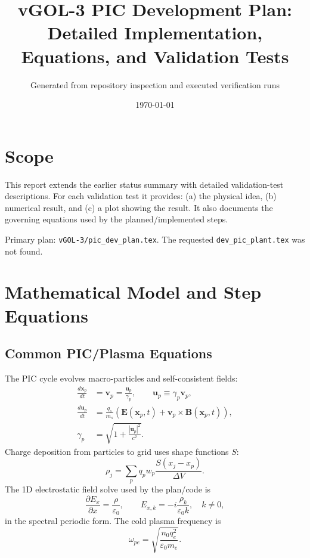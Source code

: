 \documentclass[11pt,a4paper]{article}
\title{vGOL-3 PIC Development Plan:\\Detailed Implementation, Equations, and Validation Tests}
\author{Generated from repository inspection and executed verification runs}
\date{\today}
\begin{document}
\maketitle
\tableofcontents
\newpage

\section{Scope}
This report extends the earlier status summary with detailed validation-test descriptions. For each validation test it provides: (a) the physical idea, (b) numerical result, and (c) a plot showing the result. It also documents the governing equations used by the planned/implemented steps.

Primary plan: \texttt{vGOL-3/pic\_dev\_plan.tex}. The requested \texttt{dev\_pic\_plant.tex} was not found.

\section{Mathematical Model and Step Equations}

\subsection{Common PIC/Plasma Equations}
The PIC cycle evolves macro-particles and self-consistent fields:
\begin{align}
\frac{d\mathbf{x}_p}{dt} &= \mathbf{v}_p = \frac{\mathbf{u}_p}{\gamma_p}, \qquad \mathbf{u}_p\equiv \gamma_p\mathbf{v}_p,\\
\frac{d\mathbf{u}_p}{dt} &= \frac{q_s}{m_s}\left(\mathbf{E}(\mathbf{x}_p,t)+\mathbf{v}_p\times\mathbf{B}(\mathbf{x}_p,t)\right),\\
\gamma_p &= \sqrt{1+\frac{|\mathbf{u}_p|^2}{c^2}}.
\end{align}
Charge deposition from particles to grid uses shape functions $S$:
\begin{equation}
\rho_j = \sum_p q_p w_p \frac{S(x_j-x_p)}{\Delta V}.
\end{equation}
The 1D electrostatic field solve used by the plan/code is
\begin{equation}
\frac{\partial E_x}{\partial x}=\frac{\rho}{\varepsilon_0},\qquad
E_{x,k} = -i\frac{\rho_k}{\varepsilon_0 k},\quad k\neq0,
\end{equation}
in the spectral periodic form. The cold plasma frequency is
\begin{equation}
\omega_{pe}=\sqrt{\frac{n_0 q_e^2}{\varepsilon_0 m_e}}.
\end{equation}
\end{document}
